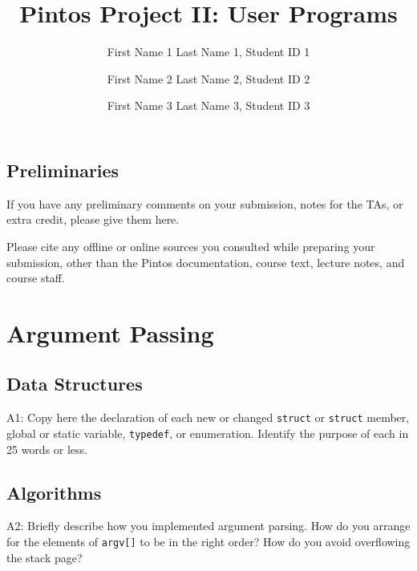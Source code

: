 \documentclass[journal]{IEEEtran}
\begin{document}
\title{\LARGE{Pintos Project II: User Programs}}

\author{First Name 1 Last Name 1, Student ID 1 \\\and 
        First Name 2 Last Name 2, Student ID 2 \\\and 
        First Name 3 Last Name 3, Student ID 3} 


\maketitle
\subsection{Preliminaries}
If you have any preliminary comments on your submission, notes for the TAs, or extra credit, please give them here.

Please cite any offline or online sources you consulted while preparing your submission, other than the Pintos documentation, course text, lecture notes, and course staff.
\section{Argument Passing}
\subsection{Data Structures}
A1: Copy here the declaration of each new or changed \lstinline{struct}  or \lstinline{struct} member, global or static variable, \lstinline{typedef}, or enumeration.  Identify the purpose of each in 25 words or less.

\subsection{Algorithms}
A2: Briefly describe how you implemented argument parsing.  How do you arrange for the elements of \lstinline{argv[]} to be in the right order? How do you avoid overflowing the stack page?
\end{document}
